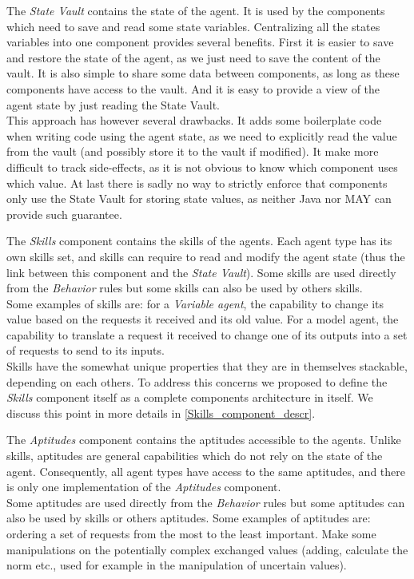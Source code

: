 The \emph{State Vault} contains the state of the agent. It is used by the components which need to save and read some state variables. Centralizing all the states variables into one component provides several benefits. First it is easier to save and restore the state of the agent, as we just need to save the content of the vault. It is also simple to share some data between components, as long as these components have access to the vault. And it is easy to provide a view of the agent state by just reading the State Vault.\\
This approach has however several drawbacks. It adds some boilerplate code when writing code using the agent state, as we need to explicitly read the value from the vault (and possibly store it to the vault if modified). It make more difficult to track side-effects, as it is not obvious to know which component uses which value. At last there is sadly no way to strictly enforce that components only use the State Vault for storing state values, as neither Java nor MAY can provide such guarantee.

The \emph{Skills} component contains the skills of the agents. Each agent type has its own skills set, and skills can require to read and modify the agent state (thus the link between this component and the \emph{State Vault}). Some skills are used directly from the \emph{Behavior} rules but some skills can also be used by others skills.\\
Some examples of skills are: for a \emph{Variable agent}, the capability to change its value based on the requests it received and its old value. For a model agent, the capability to translate a request it received to change one of its outputs into a set of requests to send to its inputs.\\
Skills have the somewhat unique properties that they are in themselves stackable, depending on each others. To address this concerns we proposed to define the \emph{Skills} component itself as a complete components architecture in itself. We discuss this point in more details in \ref{Skills_component_descr}.

The \emph{Aptitudes} component contains the aptitudes accessible to the agents. Unlike skills, aptitudes are general capabilities which do not rely on the state of the agent. Consequently, all agent types have access to the same aptitudes, and there is only one implementation of the \emph{Aptitudes} component.\\
Some aptitudes are used directly from the \emph{Behavior} rules but some aptitudes can also be used by skills or others aptitudes.
Some examples of aptitudes are: ordering a set of requests from the most to the least important. Make some manipulations on the potentially complex exchanged values (adding, calculate the norm etc., used for example in the manipulation of uncertain values).

